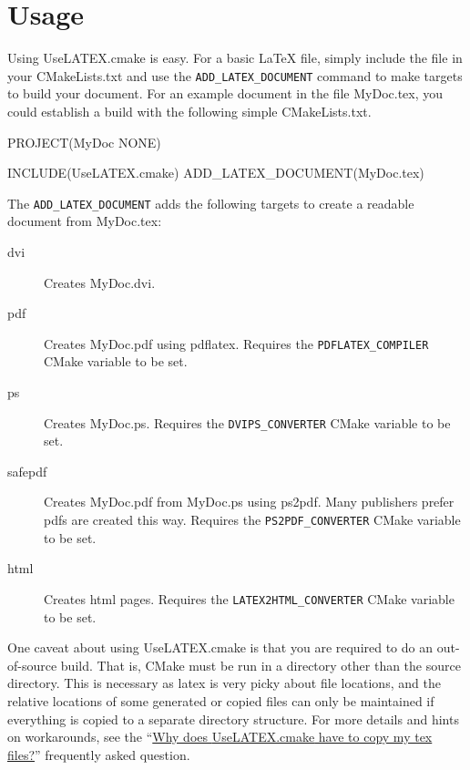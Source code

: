 \documentclass{article}
\newcommand*{\textfile}[1]{\textsf{#1}}
\newcommand*{\textprog}[1]{\textfile{#1}}
\newcommand*{\textcmake}[1]{\texttt{#1}}
\newcommand*{\textcmakevar}[1]{\textcmake{#1}}
\newcommand*{\textmaketarget}[1]{#1}
\newcommand*{\UseLATEX}{\textfile{UseLATEX.cmake}\xspace}
\newcommand*{\latex}{\LaTeX\xspace}
\newcommand*{\ald}{\textcmake{ADD\_LATEX\_DOCUMENT}\xspace}
\begin{document}

  \section{Usage}
  \label{sec:Usage}

  Using \UseLATEX is easy. For a basic \latex file, simply include the file
  in your \textfile{CMakeLists.txt} and use the \ald command to make
  targets to build your document. For an example document in the file
  \textfile{MyDoc.tex}, you could establish a build with the following
  simple \textfile{CMakeLists.txt}.

  \begin{CodeListing}
PROJECT(MyDoc NONE)

INCLUDE(UseLATEX.cmake)
ADD_LATEX_DOCUMENT(MyDoc.tex)
  \end{CodeListing}

  The \ald adds the following targets to create a readable document from
  \textfile{MyDoc.tex}:

  \begin{description}
    \item[\textmaketarget{dvi}] Creates \textfile{MyDoc.dvi}. 
    \item[\textmaketarget{pdf}] Creates \textfile{MyDoc.pdf} using
      \textprog{pdflatex}. Requires the \textcmakevar{PDFLATEX\_COMPILER}
      CMake variable to be set.
    \item[\textmaketarget{ps}] Creates \textfile{MyDoc.ps}. Requires the
      \textcmakevar{DVIPS\_CONVERTER} CMake variable to be set.
    \item[\textmaketarget{safepdf}] Creates \textfile{MyDoc.pdf} from
      \textfile{MyDoc.ps} using \textprog{ps2pdf}. Many publishers prefer
      pdfs are created this way. Requires the
      \textcmakevar{PS2PDF\_CONVERTER} CMake variable to be set.
    \item[\textmaketarget{html}] Creates html pages. Requires the
      \textcmakevar{LATEX2HTML\_CONVERTER} CMake variable to be set.
  \end{description}

  One caveat about using \UseLATEX is that you are required to do an
  out-of-source build. That is, CMake must be run in a directory other than
  the source directory. This is necessary as latex is very picky about file
  locations, and the relative locations of some generated or copied files
  can only be maintained if everything is copied to a separate directory
  structure.  For more details and hints on workarounds, see the
  ``\hyperref[sec:Why_does_UseLATEX_have_to_copy_my_tex_files]{Why does
    \UseLATEX have to copy my tex files?}'' frequently asked question.
\end{document}
